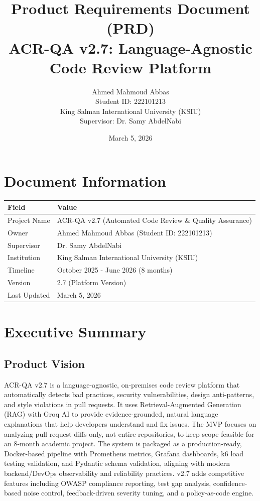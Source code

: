 \documentclass[11pt,a4paper]{article}
\title{\textbf{Product Requirements Document (PRD)\\
ACR-QA v2.7: Language-Agnostic Code Review Platform}}
\author{Ahmed Mahmoud Abbas\\
Student ID: 222101213\\
King Salman International University (KSIU)\\
Supervisor: Dr. Samy AbdelNabi}
\date{March 5, 2026}
\begin{document}
\maketitle
\thispagestyle{empty}

\vspace{1cm}

\section*{Document Information}
\begin{tabular}{ll}
\toprule
\textbf{Field} & \textbf{Value} \\
\midrule
Project Name & ACR-QA v2.7 (Automated Code Review \& Quality Assurance) \\
Owner & Ahmed Mahmoud Abbas (Student ID: 222101213) \\
Supervisor & Dr. Samy AbdelNabi \\
Institution & King Salman International University (KSIU) \\
Timeline & October 2025 - June 2026 (8 months) \\
Version & 2.7 (Platform Version) \\
Last Updated & March 5, 2026 \\
\bottomrule
\end{tabular}

\newpage
\tableofcontents
\newpage

\section{Executive Summary}

\subsection{Product Vision}
ACR-QA v2.7 is a language-agnostic, on-premises code review platform that automatically detects bad practices, security vulnerabilities, design anti-patterns, and style violations in pull requests. It uses Retrieval-Augmented Generation (RAG) with Groq AI to provide evidence-grounded, natural language explanations that help developers understand and fix issues. The MVP focuses on analyzing pull request diffs only, not entire repositories, to keep scope feasible for an 8-month academic project. The system is packaged as a production-ready, Docker-based pipeline with Prometheus metrics, Grafana dashboards, k6 load testing validation, and Pydantic schema validation, aligning with modern backend/DevOps observability and reliability practices. v2.7 adds competitive features including OWASP compliance reporting, test gap analysis, confidence-based noise control, feedback-driven severity tuning, and a policy-as-code engine.
\end{document}
